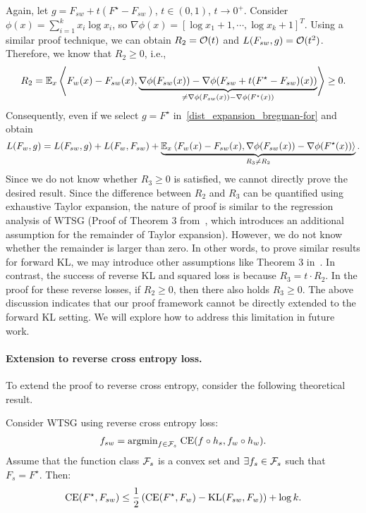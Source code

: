 Again, let $g=F_{sw} + t(F^\star-F_{sw})$, $t \in (0,1)$, $t \to 0^+$.
Consider $\phi(x)=\sum_{i=1}^k x_i \log x_i$, so $\nabla \phi(x)= [\log x_1+1, \cdots, \log x_k+1]^T$.
Using a similar proof technique, we can obtain $R_2=\mathcal{O}(t)$ and $L(F_{sw}, g)=\mathcal{O}(t^2)$.
Therefore, we know that $R_2 \ge 0$, i.e.,
$$R_2=\mathbb{E}_x \left \langle F_w(x)-F_{sw}(x), \underbrace{\nabla \phi(F_{sw}(x)) - \nabla \phi(F_{sw} + t(F^\star-F_{sw})(x))}_{\neq \nabla \phi(F_{sw}(x)) - \nabla \phi(F^\star(x))} \right \rangle \ge 0.$$
Consequently, even if we select $g=F^\star$ in~\cref{dist_expansion_bregman-for} and obtain
$$L(F_w, g) = L(F_{sw}, g) + L(F_w, F_{sw}) + \underbrace{\mathbb{E}_x \left \langle F_w(x)-F_{sw}(x), \nabla \phi(F_{sw}(x)) - \nabla \phi(F^\star(x)) \right \rangle}_{R_3 \neq R_2}.$$
Since we do not know whether $R_3 \ge 0$ is satisfied, we cannot directly prove the desired result.
Since the difference between $R_2$ and $R_3$ can be quantified using exhaustive Taylor expansion,
the nature of proof is similar to the regression analysis of WTSG (Proof of Theorem 3 from~\citet{yao2025understanding}, which introduces an additional assumption for the remainder of Taylor expansion).
However, we do not know whether the remainder is larger than zero. In other words, to prove similar results for forward KL, we may introduce other assumptions like Theorem 3 in~\citet{yao2025understanding}.
In contrast, the success of reverse KL and squared loss is because $R_3 = t \cdot R_2$. In the proof for these reverse losses, if $R_2 \ge 0$, then there also holds $R_3 \ge 0$.
The above discussion indicates that our proof framework cannot be directly extended to the forward KL setting. 
We will explore how to address this limitation in future work.









\paragraph{Extension to reverse cross entropy loss.}
To extend the proof to reverse cross entropy, consider the following theoretical result.

\begin{corollary}
\label{thm:realizable_cross}
Consider WTSG using reverse cross entropy loss:
\begin{align*}
    f_{sw} = \text{argmin}_{f \in \mathcal{F}_{s}}\; \mathrm{CE}(f \circ h_s, f_w \circ h_w).
\end{align*}
Assume that the function class $\mathcal{F}_{s}$ is a convex set and $\exists f_s \in \mathcal{F}_s$ such that $F_s = F^\star$.
Then:
\begin{align*}
    \mathrm{CE}(F^\star, F_{sw}) \le \frac{1}{2}\left(\mathrm{CE}(F^\star, F_w)-\mathrm{KL}(F_{sw}, F_w)\right) + \log k.
\end{align*}
\end{corollary}

